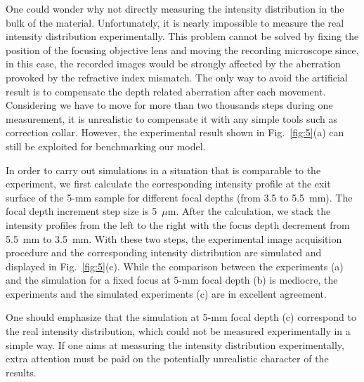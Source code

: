 \documentclass[9pt,twocolumn,twoside]{osajnl}
\begin{document}
One could wonder why not directly measuring the intensity distribution in the bulk of the material. Unfortunately, it is nearly impossible to measure the real intensity distribution experimentally. This problem cannot be solved by fixing the position of the focusing objective lens and moving the recording microscope since, in this case, the recorded images would be strongly affected by the aberration provoked by the refractive index mismatch. %
The only way to avoid the artificial result is to compensate the depth related aberration after each movement. Considering we have to move for more than two thousands steps during one measurement, it is unrealistic to compensate it with any simple tools such as correction collar. However, the experimental result shown in Fig.~\ref{fig:5}(a) can still be exploited for benchmarking our model.

In order to carry out simulations in a situation that is comparable to the experiment, we first calculate the corresponding intensity profile at the exit surface of the 5-mm sample for different focal depths (from 3.5 to 5.5~mm). The focal depth increment step size is 5~$\mu$m. After the calculation, we stack the intensity profiles from the left to the right with the focus depth decrement from 5.5~mm to 3.5~mm. With these two steps, the experimental image acquisition procedure and the corresponding intensity distribution are simulated and displayed in Fig.~\ref{fig:5}(c). While the comparison between the experiments (a) and the simulation for a fixed focus at 5-mm focal depth (b) is mediocre, the experiments and the simulated experiments (c) are in excellent agreement. %

One should emphasize that the simulation at 5-mm focal depth (c) correspond to the real intensity distribution, which could not be measured experimentally in a simple way. If one aims at measuring the intensity distribution experimentally, extra attention must be paid on the potentially unrealistic character of the results.
\end{document}

